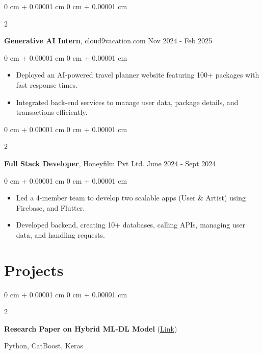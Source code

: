 \documentclass[11pt, letterpaper]{article}
\newenvironment{highlights}{
    \begin{itemize}[
        topsep=0.10 cm,
        parsep=0.10 cm,
        partopsep=0pt,
        itemsep=0pt,
        leftmargin=0 cm + 10pt
    ]
}{
    \end{itemize}
} %
\newenvironment{onecolentry}{
    \begin{adjustwidth}{
        0 cm + 0.00001 cm
    }{
        0 cm + 0.00001 cm
    }
}{
    \end{adjustwidth}
} %
\newenvironment{twocolentry}[2][]{
    \onecolentry
    \def\secondColumn{#2}
    \setcolumnwidth{\fill, 4.5 cm}
    \begin{paracol}{2}
}{
    \switchcolumn \raggedleft \secondColumn
    \end{paracol}
    \endonecolentry
} %
\begin{document}
        \begin{twocolentry}{
            Nov 2024 - Feb 2025
        }
            \textbf{Generative AI Intern}, cloud9vacation.com \end{twocolentry}

        \vspace{0.10 cm}
        \begin{onecolentry}
            \begin{highlights}
                \item Deployed an AI-powered travel planner website featuring 100+ packages with fast response times.
                \item Integrated back-end services to manage user data, package details, and transactions efficiently.
            \end{highlights}
        \end{onecolentry}
        \vspace{0.2 cm}
        \begin{twocolentry}{
            June 2024 - Sept 2024
        }
            \textbf{Full Stack Developer}, Honeyfilm Pvt Ltd.\end{twocolentry}

        \vspace{0.10 cm}
        \begin{onecolentry}
            \begin{highlights}
                \item Led a 4-member team to develop two scalable apps (User \& Artist) using Firebase, and Flutter.    
                \item Developed backend, creating 10+ databases, calling APIs, managing user data, and handling requests.
            \end{highlights}
        \end{onecolentry}
    
    \section{Projects}



\begin{twocolentry}{
    {Python, CatBoost, Keras}
}
    \textbf{Research Paper on Hybrid ML-DL Model} (\href{https://ieeexplore.ieee.org/document/10961117}{Link})
\end{twocolentry}

\vspace{0.10 cm}
\end{document}
